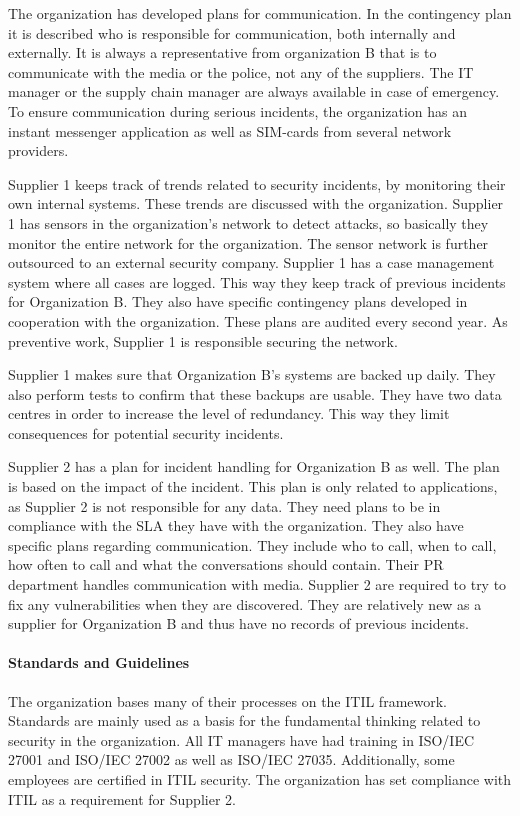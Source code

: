 The organization has developed plans for communication. In the contingency plan it is described who is responsible for communication, both internally and externally. It is always a representative from organization B that is to communicate with the media or the police, not any of the suppliers. The IT manager or the supply chain manager are always available in case of emergency. To ensure communication during serious incidents, the organization has an instant messenger application as well as SIM-cards from several network providers. 

Supplier 1 keeps track of trends related to security incidents, by monitoring their own internal systems. These trends are discussed with the organization. Supplier 1 has sensors in the organization's network to detect attacks, so basically they monitor the entire network for the organization. The sensor network is further outsourced to an external security company. Supplier 1 has a case management system where all cases are logged. This way they keep track of previous incidents for Organization B. They also have specific contingency plans developed in cooperation with the organization. These plans are audited every second year. As preventive work, Supplier 1 is responsible securing the network.

Supplier 1 makes sure that Organization B's systems are backed up daily. They also perform tests to confirm that these backups are usable. They have two data centres in order to increase the level of redundancy. This way they limit consequences for potential security incidents.

Supplier 2 has a plan for incident handling for Organization B as well. The plan is based on the impact of the incident. This plan is only related to applications, as Supplier 2 is not responsible for any data. They need plans to be in compliance with the \ac{SLA} they have with the organization. They also have specific plans regarding communication. They include who to call, when to call, how often to call and what the conversations should contain. Their PR department handles communication with media. Supplier 2 are required to try to fix any vulnerabilities when they are discovered. They are relatively new as a supplier for Organization B and thus have no records of previous incidents.

\paragraph{Standards and Guidelines}
The organization bases many of their processes on the ITIL framework. Standards are mainly used as a basis for the fundamental thinking related to security in the organization. All IT managers have had training in ISO/IEC 27001 and ISO/IEC 27002 as well as ISO/IEC 27035. Additionally, some employees are certified in ITIL security. The organization has set compliance with \ac{ITIL} as a requirement for Supplier 2. %

